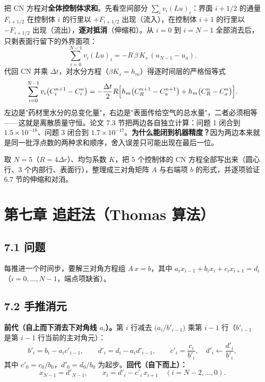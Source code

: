 \documentclass[12pt,a4paper]{ctexart}
\newcommand{\handon}[1]{\par\smallskip\noindent{\heiti 【手推练习】}#1\par\smallskip}
\begin{document}
把 CN 方程对\textbf{全体控制体求和}。先看空间部分 $\sum_i v_i(Lu)_i$：界面 $i{+}1/2$ 的通量 $F_{i+1/2}$ 在控制体 $i$ 的行里以 $+F_{i+1/2}$ 出现（流入），在控制体 $i{+}1$ 的行里以 $-F_{i+1/2}$ 出现（流出），\textbf{逐对抵消}（伸缩和）。从 $i=0$ 到 $i=N-1$ 全部消去后，只剩表面行留下的外界面项：
\begin{equation}
\sum_{i=0}^{N-1}v_i(Lu)_i=-R\,\beta\,K_s\,(u_{N-1}-u_a).
\end{equation}
代回 CN 并乘 $\Delta t$，对水分方程（$\beta K_s=h_m$）得逐时间层的严格恒等式
\begin{equation}
\sum_{i=0}^{N-1}v_i\bigl(C_i^{n+1}-C_i^n\bigr)
=-\frac{\Delta t}{2}R\Bigl[h_m\bigl(C_R^{n+1}-C_a^{n+1}\bigr)
+h_m\bigl(C_R^n-C_a^n\bigr)\Bigr].
\end{equation}
左边是"药材里水分的总变化量"，右边是"表面传给空气的总水量"，二者必须相等——这就是离散质量守恒。论文 7.3 节把两边各自独立计算：问题 1 闭合到 $1.5\times10^{-18}$、问题 3 闭合到 $1.7\times10^{-17}$。\textbf{为什么能闭到机器精度？}因为两边本来就是同一批浮点数的两种求和顺序，舍入误差只可能出现在最后一位。

\handon{取 $N=5$（$R=4\Delta r$）、均匀系数 $K$，把 5 个控制体的 CN 方程全部写出来（圆心行、3 个内部行、表面行），整理成三对角矩阵 $A$ 与右端项 $b$ 的形式，并逐项验证 6.7 节的伸缩和对消。}

\section{第七章 追赶法（Thomas 算法）}

\subsection{7.1 问题}

每推进一个时间步，要解三对角方程组 $A\,x=b$，其中 $a_i x_{i-1}+b_i x_i+c_i x_{i+1}=d_i$（$i=0,\dots,N-1$，端点项缺省）。

\subsection{7.2 手推消元}

\textbf{前代（自上而下消去下对角线 $a_i$）。}第 $i$ 行减去 $\bigl(a_i/b'_{i-1}\bigr)$ 乘第 $i-1$ 行（$b'_{i-1}$ 是第 $i-1$ 行当前的主对角元）：
\begin{equation}
b'_i=b_i-a_i c'_{i-1},\qquad d'_i=d_i-a_i d'_{i-1},\qquad
c'_i=\frac{c_i}{b'_i},\quad d'_i\leftarrow\frac{d'_i}{b'_i},
\end{equation}
其中 $c'_0=c_0/b_0$，$d'_0=d_0/b_0$ 为起步。\textbf{回代（自下而上）：}
\begin{equation}
x_{N-1}=d'_{N-1},\qquad x_i=d'_i-c'_i\,x_{i+1}\quad(i=N-2,\dots,0).
\end{equation}
\end{document}
